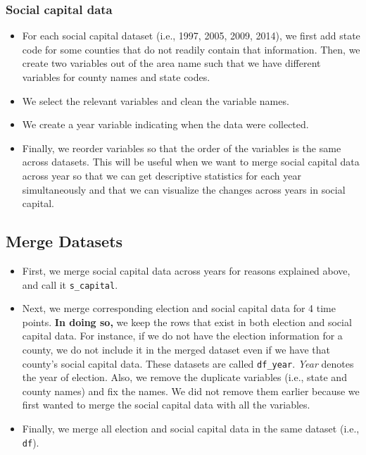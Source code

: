 \documentclass[
  english,
  man]{apa6}
\begin{document}
\hypertarget{social-capital-data}{%
\subsubsection{Social capital data}\label{social-capital-data}}

\begin{itemize}
\item
  For each social capital dataset (i.e., 1997, 2005, 2009, 2014), we first add state code for some counties that do not readily contain that information. Then, we create two variables out of the area name such that we have different variables for county names and state codes.
\item
  We select the relevant variables and clean the variable names.
\item
  We create a year variable indicating when the data were collected.
\item
  Finally, we reorder variables so that the order of the variables is the same across datasets. This will be useful when we want to merge social capital data across year so that we can get descriptive statistics for each year simultaneously and that we can visualize the changes across years in social capital.
\end{itemize}

\hypertarget{merge-datasets}{%
\subsection{Merge Datasets}\label{merge-datasets}}

\begin{itemize}
\item
  First, we merge social capital data across years for reasons explained above, and call it \texttt{s\_capital}.
\item
  Next, we merge corresponding election and social capital data for 4 time points. \textbf{In doing so,} we keep the rows that exist in both election and social capital data. For instance, if we do not have the election information for a county, we do not include it in the merged dataset even if we have that county's social capital data. These datasets are called \texttt{df\_year}. \emph{Year} denotes the year of election. Also, we remove the duplicate variables (i.e., state and county names) and fix the names. We did not remove them earlier because we first wanted to merge the social capital data with all the variables.
\item
  Finally, we merge all election and social capital data in the same dataset (i.e., \texttt{df}).
\end{itemize}
\end{document}
